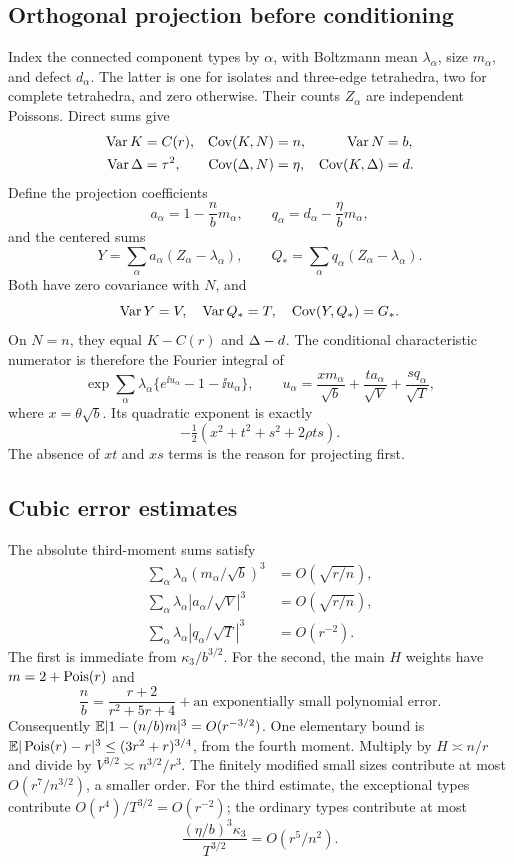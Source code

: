 \subsection{Orthogonal projection before conditioning}
Index the connected component types by $\alpha$, with Boltzmann mean $\lambda_\alpha$, size $m_\alpha$, and defect $d_\alpha$. The latter is one for isolates and three-edge tetrahedra, two for complete tetrahedra, and zero otherwise. Their counts $Z_\alpha$ are independent Poissons. Direct sums give
\begin{align*}
 \operatorname{Var} K&=C(r),&\operatorname{Cov}(K,N)&=n,&\operatorname{Var} N&=b,\\
 \operatorname{Var}\Delta&=\tau^2,&\operatorname{Cov}(\Delta,N)&=\eta,&
 \operatorname{Cov}(K,\Delta)&=d.
\end{align*}
Define the projection coefficients
\[
 a_\alpha=1-\frac nbm_\alpha,\qquad
 q_\alpha=d_\alpha-\frac\eta b m_\alpha,
\]
and the centered sums
\[
 Y=\sum_\alpha a_\alpha(Z_\alpha-\lambda_\alpha),\qquad
 Q_* =\sum_\alpha q_\alpha(Z_\alpha-\lambda_\alpha).
\]
Both have zero covariance with $N$, and
\[
 \operatorname{Var} Y=V,\quad \operatorname{Var} Q_*=T,\quad \operatorname{Cov}(Y,Q_*)=G_*.
\]
On $N=n$, they equal $K-C(r)$ and $\Delta-d$. The conditional characteristic numerator is therefore the Fourier integral of
\begin{equation}\label{sfh:eq:markedphase}
 \exp\sum_\alpha\lambda_\alpha
       \{e^{\ii u_\alpha}-1-\ii u_\alpha\},\qquad
 u_\alpha=\frac{x m_\alpha}{\sqrt b}
      +\frac{t a_\alpha}{\sqrt V}
      +\frac{s q_\alpha}{\sqrt T},
\end{equation}
where $x=\theta\sqrt b$. Its quadratic exponent is exactly
\begin{equation}\label{sfh:eq:markedquadratic}
 -\tfrac12(x^2+t^2+s^2+2\rho ts).
\end{equation}
The absence of $xt$ and $xs$ terms is the reason for projecting first.

\subsection{Cubic error estimates}
The absolute third-moment sums satisfy
\begin{align}
 \sum_\alpha\lambda_\alpha(m_\alpha/\sqrt b)^3
    &=O(\sqrt{r/n}),\nonumber\\
 \sum_\alpha\lambda_\alpha|a_\alpha/\sqrt V|^3
    &=O(\sqrt{r/n}),\label{sfh:eq:thirdmoments}\\
 \sum_\alpha\lambda_\alpha|q_\alpha/\sqrt T|^3
    &=O(r^{-2}).\nonumber
\end{align}
The first is immediate from $\kappa_3/b^{3/2}$. For the second, the main $H$ weights have $m=2+\operatorname{Pois}(r)$ and
\[
 \frac nb=\frac{r+2}{r^2+5r+4}
       +\text{an exponentially small polynomial error}.
\]
Consequently $\mathbb E|1-(n/b)m|^3=O(r^{-3/2})$. One elementary bound is
$\mathbb E|\operatorname{Pois}(r)-r|^3\le(3r^2+r)^{3/4}$, from the fourth moment. Multiply by $H\asymp n/r$ and divide by $V^{3/2}\asymp n^{3/2}/r^3$. The finitely modified small sizes contribute at most $O(r^7/n^{3/2})$, a smaller order. For the third estimate, the exceptional types contribute $O(r^4)/T^{3/2}=O(r^{-2})$; the ordinary types contribute at most
\[
 \frac{(\eta/b)^3\kappa_3}{T^{3/2}}=O(r^5/n^2).
\]

